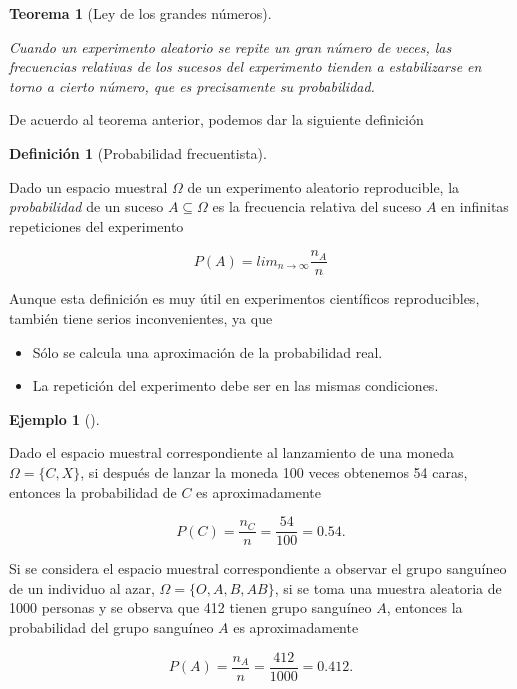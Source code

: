 \documentclass[
  a4paper,
]{scrreport}
\providecommand{\tightlist}{%
  \setlength{\itemsep}{0pt}\setlength{\parskip}{0pt}}\usepackage{longtable,booktabs,array}
\theoremstyle{plain}
\newtheorem{theorem}{Teorema}[chapter]
\theoremstyle{definition}
\newtheorem{definition}{Definición}[chapter]
\theoremstyle{definition}
\newtheorem{example}{Ejemplo}[chapter]
\theoremstyle{remark}
\begin{document}
\begin{theorem}[Ley de los grandes
números]\protect\hypertarget{thm-ley-grandes-numeros}{}\label{thm-ley-grandes-numeros}

Cuando un experimento aleatorio se repite un gran número de veces, las
frecuencias relativas de los sucesos del experimento tienden a
estabilizarse en torno a cierto número, que es precisamente su
probabilidad.

\end{theorem}

De acuerdo al teorema anterior, podemos dar la siguiente definición

\begin{definition}[Probabilidad
frecuentista]\protect\hypertarget{def-probabilidad-frecuentista}{}\label{def-probabilidad-frecuentista}

Dado un espacio muestral \(\Omega\) de un experimento aleatorio
reproducible, la \emph{probabilidad} de un suceso \(A\subseteq \Omega\)
es la frecuencia relativa del suceso \(A\) en infinitas repeticiones del
experimento

\[P(A) = lim_{n\rightarrow \infty}\frac{n_{A}}{n}\]

\end{definition}

Aunque esta definición es muy útil en experimentos científicos
reproducibles, también tiene serios inconvenientes, ya que

\begin{itemize}
\tightlist
\item
  Sólo se calcula una aproximación de la probabilidad real.
\item
  La repetición del experimento debe ser en las mismas condiciones.
\end{itemize}

\begin{example}[]\protect\hypertarget{exm-probabilidad-frecuentista}{}\label{exm-probabilidad-frecuentista}

Dado el espacio muestral correspondiente al lanzamiento de una moneda
\(\Omega=\{C,X\}\), si después de lanzar la moneda 100 veces obtenemos
54 caras, entonces la probabilidad de \(C\) es aproximadamente

\[P(C) = \frac{n_C}{n} = \frac{54}{100} = 0.54.\]

Si se considera el espacio muestral correspondiente a observar el grupo
sanguíneo de un individuo al azar, \(\Omega=\{O,A,B,AB\}\), si se toma
una muestra aleatoria de 1000 personas y se observa que 412 tienen grupo
sanguíneo \(A\), entonces la probabilidad del grupo sanguíneo \(A\) es
aproximadamente

\[P(A) = \frac{n_A}{n} = \frac{412}{1000} = 0.412.\]

\end{example}
\end{document}

